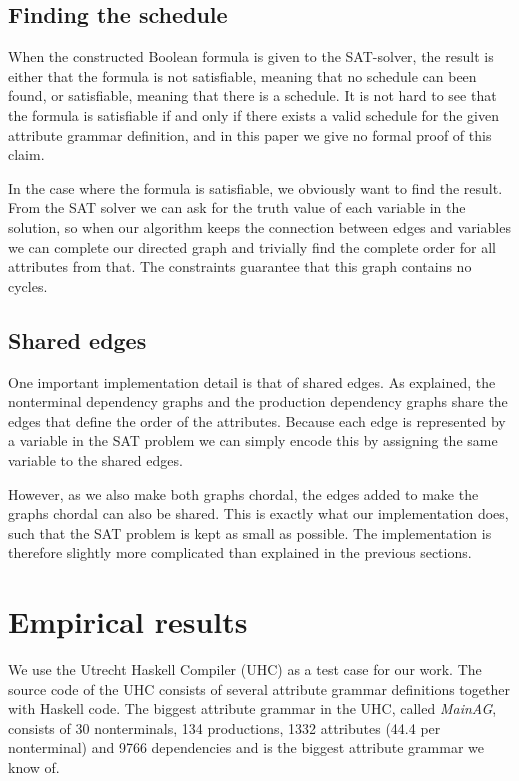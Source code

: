 \documentclass{llncs}
\begin{document}
\subsection{Finding the schedule}
When the constructed Boolean formula is given to the SAT-solver, the result is either that the formula is not satisfiable, meaning that no schedule can been found, or satisfiable, meaning that there is a schedule. It is not hard to see that the formula is satisfiable if and only if there exists a valid schedule for the given attribute grammar definition, and in this paper we give no formal proof of this claim.

In the case where the formula is satisfiable, we obviously want to find the result. From the SAT solver we can ask for the truth value of each variable in the solution, so when our algorithm keeps the connection between edges and variables we can complete our directed graph and trivially find the complete order for all attributes from that. The constraints guarantee that this graph contains no cycles.

\subsection{Shared edges}
One important implementation detail is that of shared edges. As explained, the nonterminal dependency graphs and the production dependency graphs share the edges that define the order of the attributes. Because each edge is represented by a variable in the SAT problem we can simply encode this by assigning the same variable to the shared edges.

However, as we also make both graphs chordal, the edges added to make the graphs chordal can also be shared. This is exactly what our implementation does, such that the SAT problem is kept as small as possible. The implementation is therefore slightly more complicated than explained in the previous sections.

\section{Empirical results} \label{sect:results}
We use the Utrecht Haskell Compiler (UHC) \cite{Dijkstra:2009} as a test case for our work. The source code of the UHC consists of several attribute grammar definitions together with Haskell code. The biggest attribute grammar in the UHC, called \emph{MainAG}, consists of 30 nonterminals, 134 productions, 1332 attributes (44.4 per nonterminal) and 9766 dependencies and is the biggest attribute grammar we know of.
\end{document}
